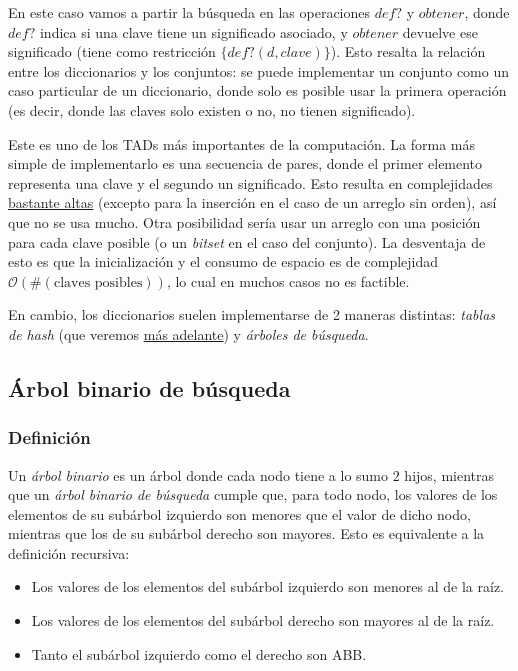 \documentclass{article}
\newcommand{\BigO}[1]{{\mathcal{O}(#1)}}
\begin{document}
En este caso vamos a partir la búsqueda en las operaciones $def?$ y $obtener$, donde $def?$ indica si una clave tiene un significado asociado, y $obtener$ devuelve ese significado (tiene como restricción $\{def?(d, clave)\}$). Esto resalta la relación entre los diccionarios y los conjuntos: se puede implementar un conjunto como un caso particular de un diccionario, donde solo es posible usar la primera operación (es decir, donde las claves solo existen o no, no tienen significado).

Este es uno de los TADs más importantes de la computación. La forma más simple de implementarlo es una secuencia de pares, donde el primer elemento representa una clave y el segundo un significado. Esto resulta en complejidades \hyperref[table-dict-complexities]{bastante altas} (excepto para la inserción en el caso de un arreglo sin orden), así que no se usa mucho. Otra posibilidad sería usar un arreglo con una posición para cada clave posible (o un \textit{bitset} en el caso del conjunto). La desventaja de esto es que la inicialización y el consumo de espacio es de complejidad $\BigO{\#(\text{claves posibles})}$, lo cual en muchos casos no es factible.


En cambio, los diccionarios suelen implementarse de 2 maneras distintas: \textit{tablas de hash} (que veremos \hyperref[sec-hash-tables]{más adelante}) y \textit{árboles de búsqueda}.

\subsection{Árbol binario de búsqueda}

\subsubsection{Definición}

Un \textit{árbol binario} es un árbol donde cada nodo tiene a lo sumo $2$ hijos, mientras que un \textit{árbol binario de búsqueda} cumple que, para todo nodo, los valores de los elementos de su subárbol izquierdo son menores que el valor de dicho nodo, mientras que los de su subárbol derecho son mayores. Esto es equivalente a la definición recursiva:
\begin{itemize}
    \item Los valores de los elementos del subárbol izquierdo son menores al de la raíz.
    \item Los valores de los elementos del subárbol derecho son mayores al de la raíz.
    \item Tanto el subárbol izquierdo como el derecho son ABB.
\end{itemize}
\end{document}
